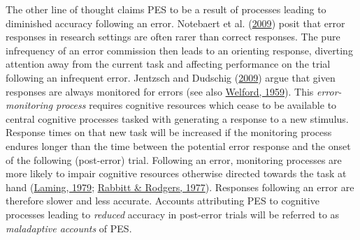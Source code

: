 \documentclass[
  man,floatsintext]{apa7}
\begin{document}
The other line of thought claims PES to be a result of processes leading to diminished accuracy following an error. Notebaert et al. (\protect\hyperlink{ref-notebaert2009}{2009}) posit that error responses in research settings are often rarer than correct responses. The pure infrequency of an error commission then leads to an orienting response, diverting attention away from the current task and affecting performance on the trial following an infrequent error. Jentzsch and Dudschig (\protect\hyperlink{ref-jentzsch2009}{2009}) argue that given responses are always monitored for errors (see also \protect\hyperlink{ref-welford1959}{Welford, 1959}). This \emph{error-monitoring process} requires cognitive resources which cease to be available to central cognitive processes tasked with generating a response to a new stimulus. Response times on that new task will be increased if the monitoring process endures longer than the time between the potential error response and the onset of the following (post-error) trial.
Following an error, monitoring processes are more likely to impair cognitive resources otherwise directed towards the task at hand (\protect\hyperlink{ref-laming1979}{Laming, 1979}; \protect\hyperlink{ref-rabbitt1977}{Rabbitt \& Rodgers, 1977}). Responses following an error are therefore slower and less accurate. Accounts attributing PES to cognitive processes leading to \emph{reduced} accuracy in post-error trials will be referred to as \emph{maladaptive accounts} of PES.
\end{document}
